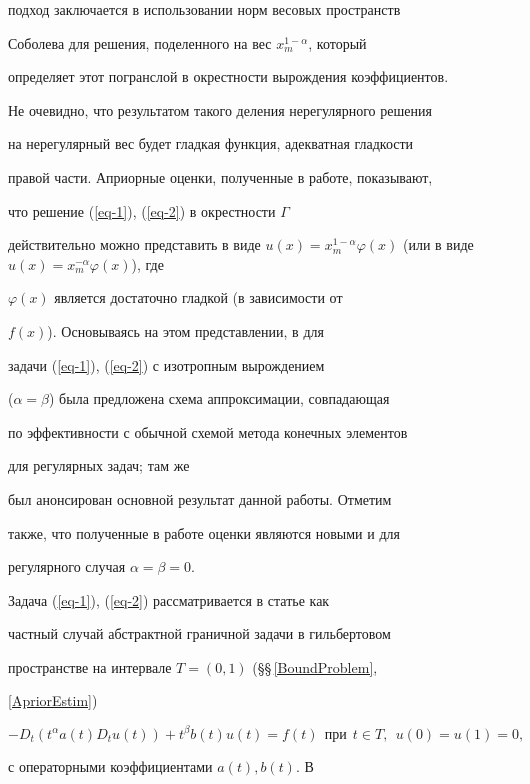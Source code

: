 подход заключается в использовании норм весовых пространств


Соболева для решения, поделенного на вес $x_m^{1-\alpha}$, который


определяет этот погранслой в окрестности вырождения коэффициентов.


Не очевидно, что результатом такого деления нерегулярного решения


на нерегулярный вес будет гладкая функция, адекватная гладкости


правой части. Априорные оценки, полученные в работе, показывают,


что решение (\ref{eq-1}), (\ref{eq-2}) в окрестности $\Gamma$


действительно можно представить в виде $u(x)=x_m^{1-\alpha}


\varphi(x)$ (или в виде $u(x)=x_m^{-\alpha} \varphi(x)$), где


$\varphi(x)$ является достаточно гладкой (в зависимости от


$f(x)$). Основываясь на этом представлении, в \cite{DE-00} для


задачи (\ref{eq-1}), (\ref{eq-2}) с изотропным вырождением


($\alpha=\beta$) была предложена схема аппроксимации, совпадающая


по эффективности с обычной схемой метода конечных элементов


для регулярных задач; там же


был анонсирован основной результат данной работы. Отметим


также, что полученные в работе оценки являются новыми и для


регулярного случая $\alpha=\beta=0$.





Задача (\ref{eq-1}), (\ref{eq-2}) рассматривается в статье как


частный случай абстрактной граничной задачи в гильбертовом


пространстве на интервале $T=(0,1)$ (\S\S\,\ref{BoundProblem},


\ref{ApriorEstim})


$$


-D_t (t^\alpha a(t)D_t u(t)) +t^\beta b(t) u(t) = f(t)


\ \ \text{при} \ \ t \in T, \ \ u(0)=u(1)=0,


$$


с операторными коэффициентами $a(t),b(t)$. В 


